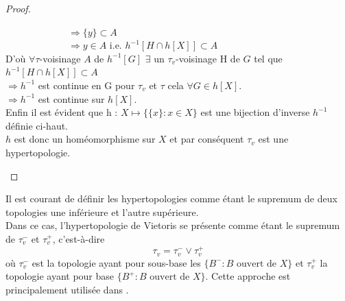 \documentclass[11pt]{report}
\theoremstyle{styletheorem}
\theoremstyle{styledef}
\theoremstyle{remark}
\newcommand{\ie}{c'est-à-dire }
\begin{document}
\begin{proof}
\begin{enumerate}
		\ \ \ \ \ \ \ \ \ \ \ \ \ $\Rightarrow \lbrace y \rbrace \subset A $\\
		\ \ \ \ \ \ \ \ \ \ \ \ \ $\Rightarrow y \in A $ i.e. $h^{-1} [H \cap h[X]] \subset A $\\
		D'où $ \forall \tau$-voisinage $A$ de $ h^{-1}[G]$ $\exists $ un $\tau_{v}$-voisinage H de $G $ tel que $ h^{-1}[ H \cap h[X]] \subset A$\\
		$\Rightarrow h^{-1}$ est continue en G pour $ \tau_{v} $ et $\tau$ cela $\forall G \in h[X]$.\\
		$\Rightarrow h^{-1}$ est continue sur $h[X]$.\\
		Enfin il est évident que h : $ X \longmapsto \lbrace \lbrace x\rbrace : x \in X \rbrace$ est une bijection d'inverse $ h^{-1}$ définie ci-haut.\\
		$h$ est donc un homéomorphisme sur $X$ et par conséquent $\tau_{v}$ est une hypertopologie.
	\end{enumerate}
\end{proof}
Il est courant de définir les hypertopologies comme étant le supremum de deux topologies une inférieure et l'autre supérieure.\\
Dans ce cas, l'hypertopologie de Vietoris se présente comme étant le supremum de $\tau_v^-$ et $\tau_v^+$, \ie $$\tau_v = \tau_v^- \vee   \tau_v^+$$ où  $\tau_v^-$ est la topologie ayant pour sous-base les $\lbrace B^- \colon B \text{ ouvert de } X \rbrace$ et  $\tau_v^+$ la topologie ayant pour base $\lbrace B^+ \colon B \text{ ouvert de } X \rbrace$. Cette approche est principalement utilisée dans \cite{b8}.
\end{document}
